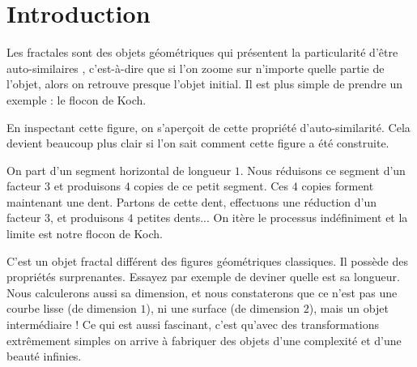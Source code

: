 \documentclass[11pt,class=report,crop=false]{standalone}
\begin{document}

\newcommand{\myvec}[2]{\begin{pmatrix}#1 \\ #2\end{pmatrix}}
\newcommand{\dist}{\text{dist}}

\newcommand{\commentfigure}[1]{#1} %





\section{Introduction}



Les fractales sont des objets géométriques qui présentent la particularité d'être
\og auto-similaires \fg{}, c'est-à-dire que si l'on zoome sur n'importe quelle partie de l'objet, alors on retrouve
presque l'objet initial. Il est plus simple de prendre un exemple : le flocon de Koch.

\commentfigure{
}


En inspectant cette figure, on s'aperçoit de cette propriété d'auto-similarité.
Cela devient beaucoup plus clair si l'on sait comment cette figure a été construite.

On part d'un segment horizontal de longueur $1$. Nous réduisons ce segment d'un facteur $3$
et produisons $4$ copies de ce petit segment. Ces $4$ copies forment maintenant une dent.
Partons de cette dent, effectuons une réduction d'un facteur $3$, et produisons $4$ petites dents...
On itère le processus indéfiniment et la \og limite \fg{} est notre flocon de Koch.

\bigskip


\commentfigure{
}


C'est un objet \og fractal \fg{} différent des figures géométriques classiques. Il possède des propriétés 
surprenantes. Essayez par exemple de deviner quelle est sa longueur. Nous calculerons aussi sa dimension, et nous constaterons que ce n'est pas une courbe lisse (de dimension $1$), ni une surface (de dimension $2$), mais un objet intermédiaire !
Ce qui est aussi fascinant, c'est qu'avec des transformations extrêmement simples on arrive à fabriquer
des objets d'une complexité et d'une beauté infinies.
\end{document}
